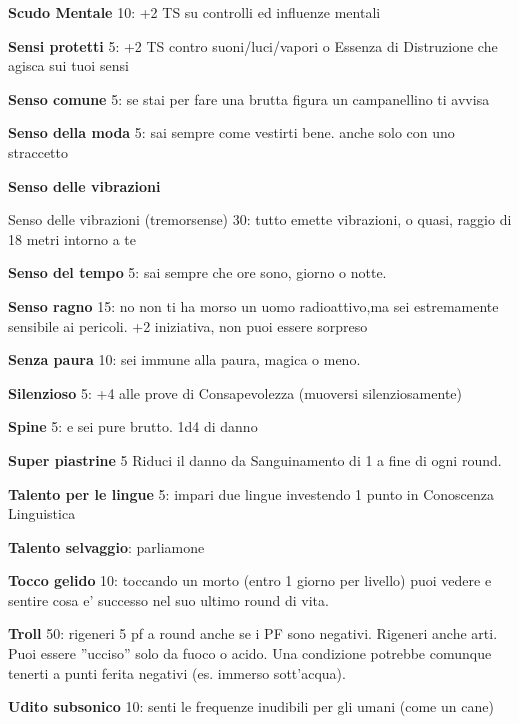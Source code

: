 \documentclass[a4paper,11pt,twoside,openany]{book}
\begin{document}
	\textbf{Scudo Mentale} 10: +2 TS su controlli ed influenze mentali
	
	\textbf{Sensi protetti} 5: +2 TS contro suoni/luci/vapori o Essenza di Distruzione che agisca sui tuoi sensi
	
	\textbf{Senso comune} 5: se stai per fare una brutta figura un campanellino ti avvisa
	
	\textbf{Senso della moda} 5: sai sempre come vestirti bene. anche solo con uno straccetto
	
	\textbf{Senso delle vibrazioni} {Senso delle vibrazioni  (tremorsense) 30: tutto emette vibrazioni, o quasi, raggio di 18 metri intorno a te
		
		\textbf{Senso del tempo} 5: sai sempre che ore sono, giorno o notte.
		
		\textbf{Senso ragno} 15: no non ti ha morso un uomo radioattivo,ma sei estremamente sensibile ai pericoli. +2 iniziativa, non puoi essere sorpreso
		
		\textbf{Senza paura} 10: sei immune alla paura, magica o meno.
		
		\textbf{Silenzioso} 5: +4 alle prove di Consapevolezza (muoversi silenziosamente)
		
		\textbf{Spine} 5: e sei pure brutto. 1d4 di danno
		
		\textbf{Super piastrine} 5 Riduci il danno da Sanguinamento di 1 a fine di ogni round.
		
		\textbf{Talento per le lingue} 5: impari due lingue investendo 1 punto in Conoscenza Linguistica
		
		\textbf{Talento selvaggio}: parliamone
		
		\textbf{Tocco gelido} 10: toccando un morto (entro 1 giorno per livello) puoi vedere e sentire cosa e' successo nel suo ultimo round di vita.
		
		\textbf{Troll} 50: rigeneri 5 pf a round anche se i PF sono negativi. Rigeneri anche arti. Puoi essere ''ucciso'' solo da fuoco o acido. Una condizione potrebbe comunque tenerti a punti ferita negativi (es. immerso sott'acqua).
		
		\textbf{Udito subsonico} 10: senti le frequenze inudibili per gli umani (come un cane)
		
}
\end{document}
